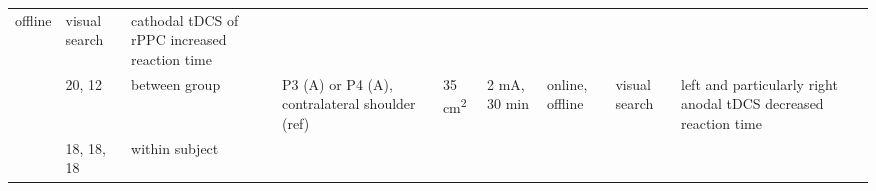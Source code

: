 \documentclass[11pt,]{memoir}
\begin{document}
\begin{longtable}[]{@{}lllllllll@{}}
\begin{minipage}[t]{0.05\columnwidth}
offline\strut
\end{minipage} & \begin{minipage}[t]{0.06\columnwidth}\raggedright
visual
search\strut
\end{minipage} & \begin{minipage}[t]{0.25\columnwidth}\raggedright
cathodal tDCS of rPPC increased reaction time\strut
\end{minipage}\tabularnewline
\begin{minipage}[t]{0.08\columnwidth}\raggedright
\textcite{Bolognini2010}\strut
\end{minipage} & \begin{minipage}[t]{0.03\columnwidth}\raggedright
20,
12\strut
\end{minipage} & \begin{minipage}[t]{0.05\columnwidth}\raggedright
between
group\strut
\end{minipage} & \begin{minipage}[t]{0.15\columnwidth}\raggedright
P3 (A) or P4 (A),
contralateral shoulder (ref)\strut
\end{minipage} & \begin{minipage}[t]{0.04\columnwidth}\raggedright
35
cm\textsuperscript{2}\strut
\end{minipage} & \begin{minipage}[t]{0.06\columnwidth}\raggedright
2 mA, 30
min\strut
\end{minipage} & \begin{minipage}[t]{0.05\columnwidth}\raggedright
online,
offline\strut
\end{minipage} & \begin{minipage}[t]{0.06\columnwidth}\raggedright
visual
search\strut
\end{minipage} & \begin{minipage}[t]{0.25\columnwidth}\raggedright
left and particularly right anodal tDCS decreased
reaction time\strut
\end{minipage}\tabularnewline
\begin{minipage}[t]{0.08\columnwidth}\raggedright
\textcite{Reinhart2015}\strut
\end{minipage} & \begin{minipage}[t]{0.03\columnwidth}\raggedright
18,
18,
18\strut
\end{minipage} & \begin{minipage}[t]{0.05\columnwidth}\raggedright
within
subject\strut
\end{minipage} & \begin{minipage}[t]{0.15\columnwidth}\raggedright

\end{minipage}
\end{longtable}
\end{document}
